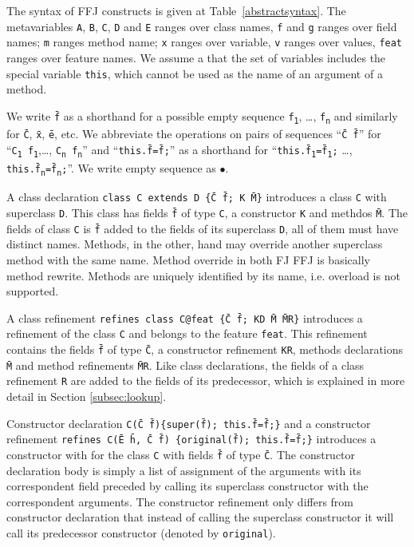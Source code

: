 The syntax of \ac{FFJ} constructs is given at Table~\ref{abstractsyntax}. The metavariables
\texttt{A}, \texttt{B}, \texttt{C}, \texttt{D} and \texttt{E} ranges over class names, \texttt{f} and \texttt{g} ranges over
field names; \texttt{m} ranges method name; \texttt{x} ranges over variable, \texttt{v} ranges over
values, \texttt{feat} ranges over feature names. We assume a that the set of variables includes the special variable \texttt{this}, which
cannot be used as the name of an argument of a method.

We write \texttt{\=f} as a shorthand for a possible empty sequence \texttt{f\textsubscript1}, \dots, \texttt{f\textsubscript{n}} 
and similarly for \texttt{\=C}, \texttt{\=x}, \texttt{\=e}, etc. We abbreviate the operations on pairs of sequences
``\texttt{\=C~\=f}'' for ``\texttt{C\textsubscript1~f\textsubscript1},\dots, \texttt{C\textsubscript{n}~f\textsubscript{n}}''
and ``\texttt{this.\=f=\=f;}'' as a shorthand for 
``\texttt{this.\=f\textsubscript1=\=f\textsubscript1;} \dots, \texttt{this.\=f\textsubscript{n}=\=f\textsubscript{n};}''.
We write empty sequence as $\bullet$.


A class declaration \texttt{class\ C~extends~D\ \{\={C} \={f}; K \={M}\}} 
introduces a class \texttt{C} with superclass \texttt{D}. This class has fields \texttt{\=f}
of type \texttt{C}, a constructor \texttt{K} and methdos \texttt{\=M}. The fields of class \texttt{C}
is \texttt{\=f} added to the fields of its superclass \texttt{D}, all of them must have distinct names.
Methods, in the other, hand may override another superclass method with the same name.
Method override in both \ac{FJ} \ac{FFJ} is basically method rewrite. 
Methods are uniquely identified by its name, i.e. overload is not supported.

A class refinement \texttt{refines~class~C@feat~\{\={C}~\={f};~KD~\={M}~\={MR}\}}
introduces a refinement of the class \texttt{C} and belongs to the feature \texttt{feat}. 
This refinement contains the fields  \texttt{\=f} of type \texttt{\=C}, 
a constructor refinement \texttt{KR}, methods declarations \texttt{\=M} and method refinements \texttt{\={MR}}.
Like class declarations, the fields of a class refinement \texttt{R} are added to the fields of its predecessor, which
is explained in more detail in Section \ref{subsec:lookup}.

Constructor declaration \texttt{C(\={C}~\={f})\{super(\={f}); this.\={f}=\={f};\}} and a constructor refinement 
\texttt{refines~C(\={E}~\={h}, \={C}~\={f}) \{original(\={f}); this.\={f}=\={f};\}} introduces a constructor with 
for the class \texttt{C} with fields \texttt{\=f} of type \texttt{\=C}. The constructor declaration body is simply 
a list of assignment of the arguments with its correspondent field preceded by calling its superclass constructor with the correspondent arguments.
The constructor refinement only differs from constructor declaration that instead of calling the superclass constructor
it will call its predecessor constructor (denoted by \texttt{original}).

